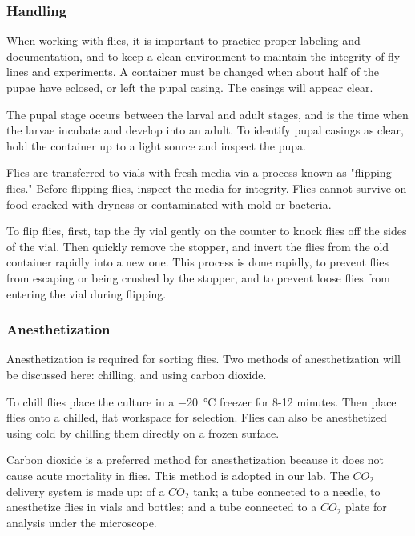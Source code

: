 			
	\subsubsection{Handling} 
		When working with flies, it is important to practice proper labeling and documentation, and to keep a clean environment to maintain the integrity of fly lines and experiments. A container must be changed when about half of the pupae have eclosed, or left the pupal casing. The casings will appear clear.\par
			
		The pupal stage occurs between the larval and adult stages, and is the time when the larvae incubate and develop into an adult. To identify pupal casings as clear, hold the container up to a light source and inspect the pupa. \par 
			
		Flies are transferred to vials with fresh media via a process known as "flipping flies." Before flipping flies, inspect the media for integrity. Flies cannot survive on food cracked with dryness or contaminated with mold or bacteria. \par 
			
		To flip flies, first, tap the fly vial gently on the counter to knock flies off the sides of the vial. Then quickly remove the stopper, and invert the flies from the old container rapidly into a new one. This process is done rapidly, to prevent flies from escaping or being crushed by the stopper, and to prevent loose flies from entering the vial during flipping. \par 
			
			

	\subsubsection{Anesthetization} Anesthetization is required for sorting flies. Two methods of anesthetization will be discussed here: chilling, and using carbon dioxide.\par
			
		To chill flies place the culture in a \SI{-20}{\celsius} freezer for 8-12 minutes. Then place flies onto a chilled, flat workspace for selection. Flies can also be anesthetized using cold by chilling them directly on a frozen surface. \par 
			
		Carbon dioxide is a preferred method for anesthetization because it does not cause acute mortality in flies. This method is adopted in our lab. The $CO_{2}$ delivery system is made up: of a $CO_{2}$ tank; a tube connected to a needle, to anesthetize flies in vials and bottles; and a tube connected to a $CO_{2}$ plate for analysis under the microscope. \par 
			
